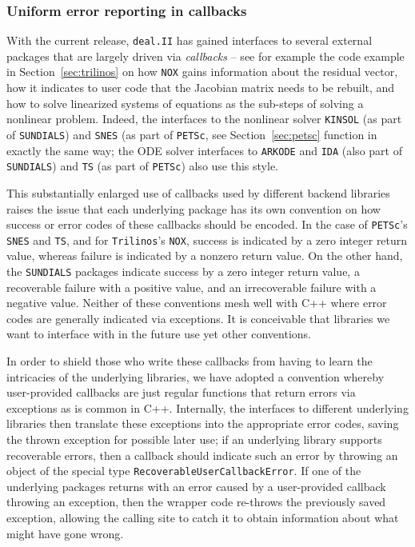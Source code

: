 \documentclass{ansarticle-preprint}
\newcommand{\specialword}[1]{\texttt{#1}}
\newcommand{\dealii}{{\specialword{deal.II}}\xspace}
\newcommand{\trilinos}{{\specialword{Trilinos}}\xspace}
\newcommand{\petsc}{\specialword{PETSc}\xspace}
\newcommand{\snes}{{\specialword{SNES}}\xspace}
\newcommand{\ts}{{\specialword{TS}}\xspace}
\newcommand{\sundials}{{\specialword{SUNDIALS}}\xspace}
\newcommand{\kinsol}{{\specialword{KINSOL}}\xspace}
\newcommand{\ida}{{\specialword{IDA}}\xspace}
\newcommand{\arkode}{{\specialword{ARKODE}}\xspace}
\begin{document}
\subsubsection{Uniform error reporting in callbacks}\label{sec:callbacks}

With the current release, \dealii{} has gained interfaces to several
external packages that are largely driven via \textit{callbacks} --
see for example the code example in Section~\ref{sec:trilinos} on how
\texttt{NOX} gains information about the residual vector, how it indicates to
user code that the Jacobian matrix needs to be rebuilt,
and how to solve linearized systems of equations as the sub-steps of
solving a nonlinear problem. Indeed, the interfaces to the nonlinear
solver \kinsol{} (as part of \sundials{}) and \snes{} (as part of \petsc, see
Section~\ref{sec:petsc} function in exactly the same way; the
ODE solver interfaces to \arkode{} and \ida{} (also part of \sundials{}) and \ts{}
(as part of \petsc{}) also use this style.

This substantially enlarged use of callbacks used by different backend
libraries raises the issue that each underlying package has its own
convention on how success or error codes of these callbacks should be
encoded. In the case of \petsc{}'s \snes{} and \ts{}, and for \trilinos{}'s \texttt{NOX},
success is indicated by a zero integer return value, whereas failure is
indicated by a nonzero return value. On the other hand, the \sundials{}
packages indicate success by a zero integer return value, a
recoverable failure with a positive value, and an irrecoverable failure
with a negative value. Neither of these conventions mesh well with C++
where error codes are generally indicated via exceptions.
It is conceivable that libraries we want to
interface with in the future use yet other conventions.

In order to shield those who write these callbacks from having to
learn the intricacies of the underlying libraries, we have adopted a
convention whereby user-provided callbacks are just regular functions
that return errors via exceptions as is common in C++. Internally, the
interfaces to different underlying libraries then translate these
exceptions into the appropriate error codes, saving the thrown exception for possible
later use; if an underlying library supports
recoverable errors, then a callback should indicate such an error by
throwing an object of the special type
\texttt{RecoverableUserCallbackError}. If one of the underlying
packages returns with an error caused by a user-provided callback
throwing an exception, then the wrapper code re-throws the previously
saved exception, allowing the calling site to catch it to obtain information
about what might have gone wrong.
\end{document}
